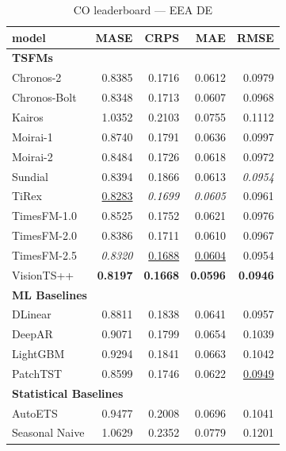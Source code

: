 \begin{table}[H]
\caption{CO leaderboard --- EEA DE}
\centering
\begin{small}
\begin{tabular}{lrrrr}
\toprule
model & MASE & CRPS & MAE & RMSE \\
\midrule
\multicolumn{5}{l}{\textbf{TSFMs}} \\
Chronos-2 & 0.8385 & 0.1716 & 0.0612 & 0.0979 \\
Chronos-Bolt & 0.8348 & 0.1713 & 0.0607 & 0.0968 \\
Kairos & 1.0352 & 0.2103 & 0.0755 & 0.1112 \\
Moirai-1 & 0.8740 & 0.1791 & 0.0636 & 0.0997 \\
Moirai-2 & 0.8484 & 0.1726 & 0.0618 & 0.0972 \\
Sundial & 0.8394 & 0.1866 & 0.0613 & \textit{0.0954} \\
TiRex & \underline{0.8283} & \textit{0.1699} & \textit{0.0605} & 0.0961 \\
TimesFM-1.0 & 0.8525 & 0.1752 & 0.0621 & 0.0976 \\
TimesFM-2.0 & 0.8386 & 0.1711 & 0.0610 & 0.0967 \\
TimesFM-2.5 & \textit{0.8320} & \underline{0.1688} & \underline{0.0604} & 0.0954 \\
VisionTS++ & \textbf{0.8197} & \textbf{0.1668} & \textbf{0.0596} & \textbf{0.0946} \\
\midrule
\multicolumn{5}{l}{\textbf{ML Baselines}} \\
DLinear & 0.8811 & 0.1838 & 0.0641 & 0.0957 \\
DeepAR & 0.9071 & 0.1799 & 0.0654 & 0.1039 \\
LightGBM & 0.9294 & 0.1841 & 0.0663 & 0.1042 \\
PatchTST & 0.8599 & 0.1746 & 0.0622 & \underline{0.0949} \\
\midrule
\multicolumn{5}{l}{\textbf{Statistical Baselines}} \\
AutoETS & 0.9477 & 0.2008 & 0.0696 & 0.1041 \\
Seasonal Naive & 1.0629 & 0.2352 & 0.0779 & 0.1201 \\
\bottomrule
\end{tabular}
\end{small}
\end{table}
